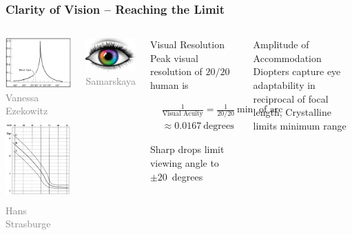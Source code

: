 \documentclass[10pt]{beamer}
\begin{document}
\begin{frame}
\frametitle{Clarity of Vision -- Reaching the Limit}
\begin{columns}
  \begin{center}
  \includegraphics[width=1.5in]{Figures/Visual-Acuity.png}
  \newline
  {\tiny \textcolor{gray}{\textcopyright Vanessa Ezekowitz}}
  \vspace{5mm}
  \includegraphics[width=1.5in, height=1.25in]{Figures/Visual-Accommodation.png}
  \newline
  {\tiny \textcolor{gray}{\textcopyright Hans Strasburge}}
  \end{center}
  \includegraphics[width=0.75in]{Figures/Visual-HumanEye.png}
  {\tiny \textcolor{gray}{\textcopyright Samarskaya}}
\begin{block}{Visual Resolution}
  Peak visual resolution of $20/20$ human is
  \begin{footnotesize}
  \begin{equation*}
  \begin{split}
  &\frac{1}{\text{Visual Acuity}}
  = \frac{1}{20/20}~\text{min. of arc} \\
  &\approx 0.0167~\text{degrees}
  \end{split}
  \end{equation*}
  \end{footnotesize}
  Sharp drops limit viewing angle to $\pm 20$~degrees
\end{block}
\begin{block}{Amplitude of Accommodation}
  Diopters capture eye adaptability in reciprocal of focal length,
  Crystalline limits minimum range
\end{block}
\end{columns}
\end{frame}
\end{document}
